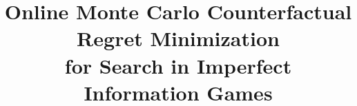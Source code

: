\documentclass{aamas2015}
\begin{document}

\title{Online Monte Carlo Counterfactual Regret Minimization\\ for Search in Imperfect Information Games}




%
%
%
%

%

\end{document}
